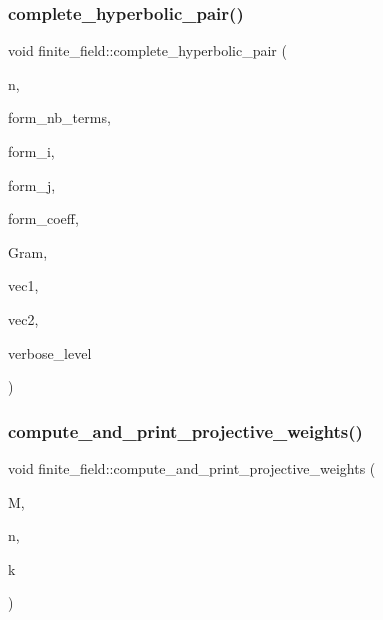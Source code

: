 \subsubsection{\texorpdfstring{complete\+\_\+hyperbolic\+\_\+pair()}{complete\_hyperbolic\_pair()}}
{\footnotesize\ttfamily void finite\+\_\+field\+::complete\+\_\+hyperbolic\+\_\+pair (\begin{DoxyParamCaption}\item[{\mbox{\hyperlink{galois_8h_a09fddde158a3a20bd2dcadb609de11dc}{I\+NT}}}]{n,  }\item[{\mbox{\hyperlink{galois_8h_a09fddde158a3a20bd2dcadb609de11dc}{I\+NT}}}]{form\+\_\+nb\+\_\+terms,  }\item[{\mbox{\hyperlink{galois_8h_a09fddde158a3a20bd2dcadb609de11dc}{I\+NT}} $\ast$}]{form\+\_\+i,  }\item[{\mbox{\hyperlink{galois_8h_a09fddde158a3a20bd2dcadb609de11dc}{I\+NT}} $\ast$}]{form\+\_\+j,  }\item[{\mbox{\hyperlink{galois_8h_a09fddde158a3a20bd2dcadb609de11dc}{I\+NT}} $\ast$}]{form\+\_\+coeff,  }\item[{\mbox{\hyperlink{galois_8h_a09fddde158a3a20bd2dcadb609de11dc}{I\+NT}} $\ast$}]{Gram,  }\item[{\mbox{\hyperlink{galois_8h_a09fddde158a3a20bd2dcadb609de11dc}{I\+NT}} $\ast$}]{vec1,  }\item[{\mbox{\hyperlink{galois_8h_a09fddde158a3a20bd2dcadb609de11dc}{I\+NT}} $\ast$}]{vec2,  }\item[{\mbox{\hyperlink{galois_8h_a09fddde158a3a20bd2dcadb609de11dc}{I\+NT}}}]{verbose\+\_\+level }\end{DoxyParamCaption})}

\mbox{\label{classfinite__field_a10400b61be77e10576e1c8bec2d8fcde}} 
\subsubsection{\texorpdfstring{compute\+\_\+and\+\_\+print\+\_\+projective\+\_\+weights()}{compute\_and\_print\_projective\_weights()}}
{\footnotesize\ttfamily void finite\+\_\+field\+::compute\+\_\+and\+\_\+print\+\_\+projective\+\_\+weights (\begin{DoxyParamCaption}\item[{\mbox{\hyperlink{galois_8h_a09fddde158a3a20bd2dcadb609de11dc}{I\+NT}} $\ast$}]{M,  }\item[{\mbox{\hyperlink{galois_8h_a09fddde158a3a20bd2dcadb609de11dc}{I\+NT}}}]{n,  }\item[{\mbox{\hyperlink{galois_8h_a09fddde158a3a20bd2dcadb609de11dc}{I\+NT}}}]{k }\end{DoxyParamCaption})}

